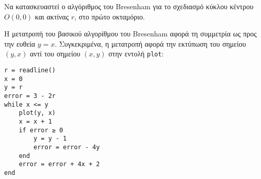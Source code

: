 \begin{exercise}
		 Να κατασκευαστεί ο αλγόριθμος του Bresenham για το σχεδιασμό κύκλου κέντρου $O(0,0)$ και ακτίνας $r$, στο πρώτο οκταμόριο.
\end{exercise}

\begin{solution}


Η μετατροπή του βασικού αλγορίθμου του Bresenham αφορά τη συμμετρία ως προς την ευθεία $y = x$. Συγκεκριμένα, η μετατροπή αφορά την εκτύπωση του σημείου $(y, x)$ αντί του σημείου $(x, y)$ στην εντολή \texttt{plot}:

\begin{lstlisting} 
r = readline()
x = 0
y = r
error = 3 - 2r
while x <= y
    plot(y, x)
    x = x + 1
    if error ≥ 0
        y = y - 1
        error = error - 4y
    end
    error = error + 4x + 2
end

\end{lstlisting}

\end{solution}